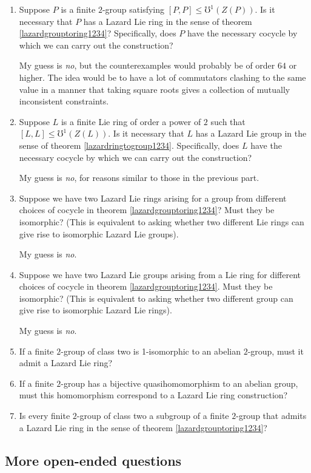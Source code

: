 \documentclass[10pt]{amsart}
\begin{document}
\begin{enumerate}
\item Suppose $P$ is a finite $2$-group satisfying $[P,P] \le
  \mho^1(Z(P))$. Is it necessary that $P$ has a Lazard Lie ring in the
  sense of theorem \ref{lazardgrouptoring1234}? Specifically, does $P$
  have the necessary cocycle by which we can carry out the
  construction? 

  My guess is {\em no}, but the counterexamples would probably be of
  order $64$ or higher. The idea would be to have a lot of commutators
  clashing to the same value in a manner that taking square roots gives
  a collection of mutually inconsistent constraints.
\item Suppose $L$ is a finite Lie ring of order a power of $2$ such
  that $[L,L] \le \mho^1(Z(L))$. Is it necessary that $L$ has a Lazard
  Lie group in the sense of theorem
  \ref{lazardringtogroup1234}. Specifically, does $L$ have the
  necessary cocycle by which we can carry out the construction?

  My guess is {\em no}, for reasons similar to those in the previous
  part.
\item Suppose we have two Lazard Lie rings arising for a group from
  different choices of cocycle in theorem \ref{lazardgrouptoring1234}?
  Must they be isomorphic? (This is equivalent to asking whether two
  different Lie rings can give rise to isomorphic Lazard Lie groups).

  My guess is {\em no}.
\item Suppose we have two Lazard Lie groups arising from a Lie ring
  for different choices of cocycle in theorem
  \ref{lazardgrouptoring1234}. Must they be isomorphic? (This is
  equivalent to asking whether two different group can give rise to
  isomorphic Lazard Lie rings).

  My guess is {\em no}.
\item If a finite $2$-group of class two is 1-isomorphic to an abelian
  $2$-group, must it admit a Lazard Lie ring?
\item If a finite $2$-group has a bijective quasihomomorphism to an
  abelian group, must this homomorphism correspond to a Lazard Lie
  ring construction?
\item Is every finite $2$-group of class two a subgroup of a finite
  $2$-group that admits a Lazard Lie ring in the sense of theorem
  \ref{lazardgrouptoring1234}?
\end{enumerate}

\subsection{More open-ended questions}
\end{document}
